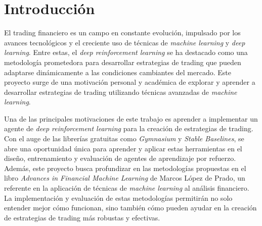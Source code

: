 \documentclass[a4paper,12pt, twoside]{report}
\begin{document}

\renewcommand{\tablename}{\textbf{Tabla}} %
\renewcommand{\figurename}{\textbf{Figura}} %
\renewcommand{\listtablename}{Índice de tablas}

\title{}
\date{}
\maketitle


\clearpage
{}
\setcounter{page}{1}

\tableofcontents

\listoffigures

\listoftables


\clearpage
{}
\setcounter{page}{1}


\chapter{Introducción}

El trading financiero es un campo en constante evolución, impulsado por los avances tecnológicos 
y el creciente uso de técnicas de \textit{machine learning} y \textit{deep learning}. Entre estas, 
el \textit{deep reinforcement learning} se ha destacado como una metodología prometedora para 
desarrollar estrategias de trading que pueden adaptarse dinámicamente a las condiciones cambiantes 
del mercado. Este proyecto surge de una motivación personal y académica de explorar y aprender a 
desarrollar estrategias de trading utilizando técnicas avanzadas de \textit{machine learning}.

Una de las principales motivaciones de este trabajo es aprender a implementar un agente de 
\textit{deep reinforcement learning} para la creación de estrategias de trading. Con el auge 
de las librerías gratuitas como \textit{Gymnasium} y \textit{Stable Baselines}, se abre una 
oportunidad única para aprender y aplicar estas herramientas en el diseño, entrenamiento y evaluación 
de agentes de aprendizaje por refuerzo. Además, este proyecto busca profundizar en las metodologías 
propuestas en el libro \textit{Advances in Financial Machine Learning} de Marcos López de Prado, 
un referente en la aplicación de técnicas de \textit{machine learning} al análisis financiero. 
La implementación y evaluación de estas metodologías permitirán no solo entender mejor cómo 
funcionan, sino también cómo pueden ayudar en la creación de estrategias de trading más robustas 
y efectivas.
\end{document}
